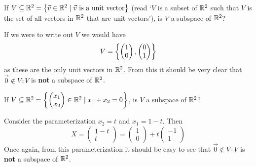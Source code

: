 \begin{example}{}{}
    If $V \subseteq \mathbb R^{2} = \left\{\vec{v} \in \mathbb R^{2} \mid \vec{v} \text{ is a unit vector} \right\}$ (read `$V$ is a subset of $\mathbb R^{2}$ such that $V$ is the set of all vectors in $\mathbb R^{2}$ that are unit vectors'), is $V$ a subspace of $\mathbb R^{2}$?

    \begin{solution}
        If we were to write out $V$ we would have 
        \[
            V = \left\{\begin{pmatrix}
                1 \\ 0
            \end{pmatrix}, \begin{pmatrix}
                0 \\ 1
            \end{pmatrix} \right\} 
        \]        
        as these are the only unit vectors in $\mathbb R^2$. From this it should be very clear that $\vec{0} \not\in V \therefore V$ is \textbf{not} a subspace of $\mathbb R^2$.
    \end{solution}
\end{example}

\begin{example}{}{}
    If $V \subseteq \mathbb R^{2} = \left\{\begin{pmatrix} x_1 \\ x_2 \end{pmatrix} \in \mathbb R^{2} \mid x_1 + x_2 = 0 \right\}$, is $V$ a subspace of $\mathbb R^2$?

    \begin{solution}
        Consider the parameterization $x_2 = t$ and $x_1 = 1-t$. Then 
        \[
            X = \begin{pmatrix}
                1 - t \\ t
            \end{pmatrix} 
            = 
            \begin{pmatrix}
                1 \\ 0
            \end{pmatrix}
            + 
            t\begin{pmatrix}
                -1 \\ 1
            \end{pmatrix}
        \]
        Once again, from this parameterization it should be easy to see that $\vec{0} \not\in V \therefore V$ is \textbf{not} a subspace of $\mathbb R^2$.
    \end{solution}
\end{example}

